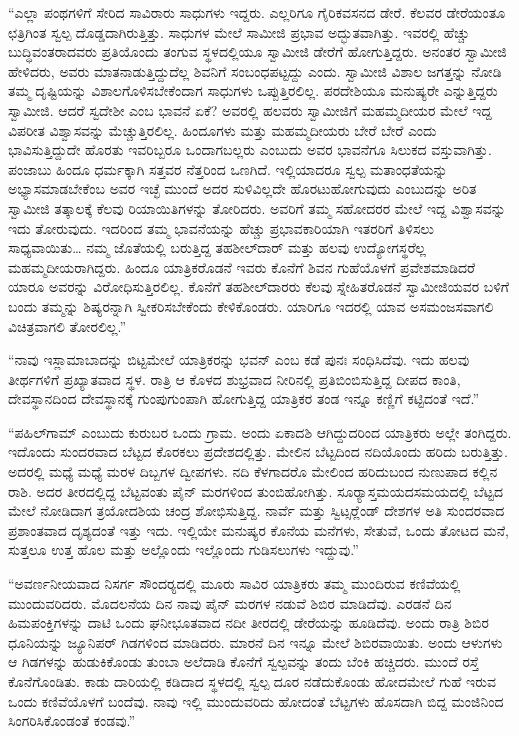  “ಎಲ್ಲಾ ಪಂಥಗಳಿಗೆ ಸೇರಿದ ಸಾವಿರಾರು ಸಾಧುಗಳು ಇದ್ದರು. ಎಲ್ಲರಿಗೂ ಗೈರಿಕವಸನದ ಡೇರೆ. ಕೆಲವರ ಡೇರೆಯಂತೂ ಛತ್ರಿಗಿಂತ ಸ್ವಲ್ಪ ದೊಡ್ಡದಾಗಿರುತ್ತಿತ್ತು. ಸಾಧುಗಳ ಮೇಲೆ ಸಾಮೀಜಿ ಪ್ರಭಾವ ಅದ್ಭುತವಾಗಿತ್ತು. ಇವರಲ್ಲಿ ಹೆಚ್ಚು ಬುದ್ಧಿವಂತರಾದವರು ಪ್ರತಿಯೊಂದು ತಂಗುವ ಸ್ಥಳದಲ್ಲಿಯೂ ಸ್ವಾಮೀಜಿ ಡೇರೆಗೆ ಹೋಗುತ್ತಿದ್ದರು. ಅನಂತರ ಸ್ವಾಮೀಜಿ ಹೇಳಿದರು, ಅವರು ಮಾತನಾಡುತ್ತಿದ್ದುದೆಲ್ಲ ಶಿವನಿಗೆ ಸಂಬಂಧಪಟ್ಟದ್ದು ಎಂದು. ಸ್ವಾಮೀಜಿ ವಿಶಾಲ ಜಗತ್ತನ್ನು ನೋಡಿ ತಮ್ಮ ದೃಷ್ಟಿಯನ್ನು ವಿಶಾಲಗೊಳಿಸಬೇಕೆಂದಾಗ ಸಾಧುಗಳು ಒಪ್ಪುತ್ತಿರಲಿಲ್ಲ. ಪರದೇಶಿಯೂ ಮನುಷ್ಯರೇ ಎನ್ನುತ್ತಿದ್ದರು ಸ್ವಾಮೀಜಿ. ಆದರೆ ಸ್ವದೇಶೀ ಎಂಬ ಭಾವನೆ ಏಕೆ? ಅವರಲ್ಲಿ ಹಲವರು ಸ್ವಾಮೀಜಿಗೆ ಮಹಮ್ಮದೀಯರ ಮೇಲೆ ಇದ್ದ ವಿಪರೀತ ವಿಶ್ವಾಸವನ್ನು ಮೆಚ್ಚುತ್ತಿರಲಿಲ್ಲ. ಹಿಂದೂಗಳು ಮತ್ತು ಮಹಮ್ಮದೀಯರು ಬೇರೆ ಬೇರೆ ಎಂದು ಭಾವಿಸುತ್ತಿದ್ದುದೇ ಹೊರತು ಇವರಿಬ್ಬರೂ ಒಂದಾಗಬಲ್ಲರು ಎಂಬುದು ಅವರ ಭಾವನೆಗೂ ಸಿಲುಕದ ವಸ್ತುವಾಗಿತ್ತು. ಪಂಜಾಬು ಹಿಂದೂ ಧರ್ಮಕ್ಕಾಗಿ ಸತ್ತವರ ನೆತ್ತರಿಂದ ಒಣಗಿದೆ. ಇಲ್ಲಿಯಾದರೂ ಸ್ವಲ್ಪ ಮತಾಂಧತೆಯನ್ನು ಅಭ್ಯಾಸಮಾಡಬೇಕೆಂಬ ಅವರ ಇಚ್ಛೆ ಮುಂದೆ ಅದರ ಸುಳಿವಿಲ್ಲದೇ ಹೊರಟುಹೋಗುವುದು ಎಂಬುದನ್ನು ಅರಿತ ಸ್ವಾಮೀಜಿ ತತ್ಕಾಲಕ್ಕೆ ಕೆಲವು ರಿಯಾಯಿತಿಗಳನ್ನು ತೋರಿದರು. ಅವರಿಗೆ ತಮ್ಮ ಸಹೋದರರ ಮೇಲೆ ಇದ್ದ ವಿಶ್ವಾಸವನ್ನು ಇದು ತೋರುವುದು. ಇದರಿಂದ ತಮ್ಮ ಭಾವನೆಯನ್ನು ಹೆಚ್ಚು ಪ್ರಭಾವಕಾರಿಯಾಗಿ ಇತರರಿಗೆ ತಿಳಿಸಲು ಸಾಧ್ಯವಾಯಿತು… ನಮ್ಮ ಜೊತೆಯಲ್ಲಿ ಬರುತ್ತಿದ್ದ ತಹಶೀಲ್‍ದಾರ್ ಮತ್ತು ಹಲವು ಉದ್ಯೋಗಸ್ಥರೆಲ್ಲ ಮಹಮ್ಮದೀಯರಾಗಿದ್ದರು. ಹಿಂದೂ ಯಾತ್ರಿಕರೊಡನೆ ಇವರು ಕೊನೆಗೆ ಶಿವನ ಗುಹೆಯೊಳಗೆ ಪ್ರವೇಶಮಾಡಿದರೆ ಯಾರೂ ಅವರನ್ನು ವಿರೋಧಿಸುತ್ತಿರಲಿಲ್ಲ. ಕೊನೆಗೆ ತಹಶೀಲ್‍ದಾರರು ಕೆಲವು ಸ್ನೇಹಿತರೊಡನೆ ಸ್ವಾಮೀಜಿಯವರ ಬಳಿಗೆ ಬಂದು ತಮ್ಮನ್ನು ಶಿಷ್ಯರನ್ನಾಗಿ ಸ್ವೀಕರಿಸಬೇಕೆಂದು ಕೇಳಿಕೊಂಡರು. ಯಾರಿಗೂ ಇದರಲ್ಲಿ ಯಾವ ಅಸಮಂಜಸವಾಗಲಿ ವಿಚಿತ್ರವಾಗಲಿ ತೋರಲಿಲ್ಲ.” 

 “ನಾವು ಇಸ್ಲಾಮಾಬಾದನ್ನು ಬಿಟ್ಟಮೇಲೆ ಯಾತ್ರಿಕರನ್ನು ಭವನ್ ಎಂಬ ಕಡೆ ಪುನಃ ಸಂಧಿಸಿದೆವು. ಇದು ಹಲವು ತೀರ್ಥಗಳಿಗೆ ಪ್ರಖ್ಯಾತವಾದ ಸ್ಥಳ. ರಾತ್ರಿ ಆ ಕೊಳದ ಶುಭ್ರವಾದ ನೀರಿನಲ್ಲಿ ಪ್ರತಿಬಿಂಬಿಸುತ್ತಿದ್ದ ದೀಪದ ಕಾಂತಿ, ದೇವಸ್ಥಾನದಿಂದ ದೇವಸ್ಥಾನಕ್ಕೆ ಗುಂಪುಗುಂಪಾಗಿ ಹೋಗುತ್ತಿದ್ದ ಯಾತ್ರಿಕರ ತಂಡ ಇನ್ನೂ ಕಣ್ಣಿಗೆ ಕಟ್ಟಿದಂತೆ ಇದೆ.” 

 “ಪಹಿಲ್‍ಗಾಮ್ ಎಂಬುದು ಕುರುಬರ ಒಂದು ಗ್ರಾಮ. ಅಂದು ಏಕಾದಶಿ ಆಗಿದ್ದುದರಿಂದ ಯಾತ್ರಿಕರು ಅಲ್ಲೇ ತಂಗಿದ್ದರು. ಇದೊಂದು ಸುಂದರವಾದ ಬೆಟ್ಟದ ಕೊರಕಲು ಪ್ರದೇಶದಲ್ಲಿತ್ತು. ಮೇಲಿನ ಬೆಟ್ಟದಿಂದ ನದಿಯೊಂದು ಹರಿದು ಬರುತ್ತಿತ್ತು. ಅದರಲ್ಲಿ ಮಧ್ಯೆ ಮಧ್ಯೆ ಮರಳ ದಿಬ್ಬಗಳ ದ್ವೀಪಗಳು. ನದಿ ಕೆಳಗಾದರೊ ಮೇಲಿಂದ ಹರಿದುಬಂದ ನುಣುಪಾದ ಕಲ್ಲಿನ ರಾಶಿ. ಅದರ ತೀರದಲ್ಲಿದ್ದ ಬೆಟ್ಟವಂತು ಪೈನ್ ಮರಗಳಿಂದ ತುಂಬಿಹೋಗಿತ್ತು. ಸೂರ‍್ಯಾಸ್ತಮಯದಸಮಯದಲ್ಲಿ ಬೆಟ್ಟದ ಮೇಲೆ ನೋಡಿದಾಗ ತ್ರಯೋದಶಿಯ ಚಂದ್ರ ಶೋಭಿಸುತ್ತಿದ್ದ. ನಾರ್ವೆ ಮತ್ತು ಸ್ವಿಟ್ಸರ್‍ಲೆಂಡ್ ದೇಶಗಳ ಅತಿ ಸುಂದರವಾದ ಪ್ರಶಾಂತವಾದ ದೃಶ್ಯದಂತೆ ಇತ್ತು ಇದು. ಇಲ್ಲಿಯೇ ಮನುಷ್ಯರ ಕೊನೆಯ ಮನೆಗಳು, ಸೇತುವೆ, ಒಂದು ತೋಟದ ಮನೆ, ಸುತ್ತಲೂ ಉತ್ತ ಹೊಲ ಮತ್ತು ಅಲ್ಲೊಂದು ಇಲ್ಲೊಂದು ಗುಡಿಸಲುಗಳು ಇದ್ದುವು.”

 “ಅವರ್ಣನೀಯವಾದ ನಿಸರ್ಗ ಸೌಂದರ‍್ಯದಲ್ಲಿ ಮೂರು ಸಾವಿರ ಯಾತ್ರಿಕರು ತಮ್ಮ ಮುಂದಿರುವ ಕಣಿವೆಯಲ್ಲಿ ಮುಂದುವರಿದರು. ಮೊದಲನೆಯ ದಿನ ನಾವು ಪೈನ್ ಮರಗಳ ನಡುವೆ ಶಿಬಿರ ಮಾಡಿದೆವು. ಎರಡನೆ ದಿನ ಹಿಮಪಂಕ್ತಿಗಳನ್ನು ದಾಟಿ ಒಂದು ಘನೀಭೂತವಾದ ನದೀ ತೀರದಲ್ಲಿ ಡೇರೆಯನ್ನು ಹೂಡಿದೆವು. ಅಂದು ರಾತ್ರಿ ಶಿಬಿರ ಧೂನಿಯನ್ನು ಜ್ಯೂನಿಪರ್ ಗಿಡಗಳಿಂದ ಮಾಡಿದರು. ಮಾರನೆ ದಿನ ಇನ್ನೂ ಮೇಲೆ ಶಿಬಿರವಾಯಿತು. ಅಂದು ಆಳುಗಳು ಆ ಗಿಡಗಳನ್ನು ಹುಡುಕಿಕೊಂಡು ತುಂಬಾ ಅಲೆದಾಡಿ ಕೊನೆಗೆ ಸ್ವಲ್ಪವನ್ನು ತಂದು ಬೆಂಕಿ ಹಚ್ಚಿದರು. ಮುಂದೆ ರಸ್ತೆ ಕೊನೆಗೊಂಡಿತು. ಕಾಡು ದಾರಿಯಲ್ಲಿ ಕಡಿದಾದ ಸ್ಥಳದಲ್ಲಿ ಸ್ವಲ್ಪ ದೂರ ನಡೆದುಕೊಂಡು ಹೋದಮೇಲೆ ಗುಹೆ ಇರುವ ಒಂದು ಕಣಿವೆಯೊಳಗೆ ಬಂದೆವು. ನಾವು ಇಲ್ಲಿ ಮುಂದುವರಿದು ಹೋದಂತೆ ಬೆಟ್ಟಗಳು ಹೊಸದಾಗಿ ಬಿದ್ದ ಮಂಜಿನಿಂದ ಸಿಂಗರಿಸಿಕೊಂಡಂತೆ ಕಂಡವು.” 

